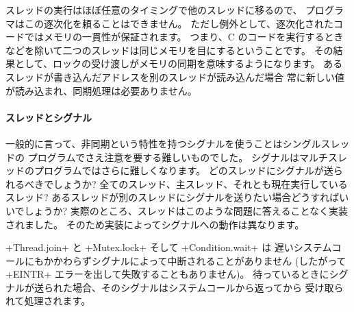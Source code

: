 スレッドの実行はほぼ任意のタイミングで他のスレッドに移るので、
プログラマはこの逐次化を頼ることはできません。
ただし例外として、逐次化されたコードではメモリの一貫性が保証されます。
つまり、C のコードを実行するときなどを除いて二つのスレッドは同じメモリを目にするということです。
その結果として、ロックの受け渡しがメモリの同期を意味するようになります。
あるスレッドが書き込んだアドレスを別のスレッドが読み込んだ場合
常に新しい値が読み込まれ、同期処理は必要ありません。

\paragraph {スレッドとシグナル}

一般的に言って、非同期という特性を持つシグナルを使うことはシングルスレッドの
プログラムでさえ注意を要する難しいものでした。
シグナルはマルチスレッドのプログラムではさらに難しくなります。
どのスレッドにシグナルが送られるべきでしょうか?
全てのスレッド、主スレッド、それとも現在実行しているスレッド?
あるスレッドが別のスレッドにシグナルを送りたい場合どうすればいいでしょうか?
実際のところ、スレッドはこのような問題に答えることなく実装されました。
そのため実装によってシグナルへの動作は異なります。

\ml+Thread.join+ と \ml+Mutex.lock+ そして \ml+Condition.wait+ は
遅いシステムコールにもかかわらずシグナルによって中断されることがありません
(したがって \ml+EINTR+ エラーを出して失敗することもありません)。
待っているときにシグナルが送られた場合、そのシグナルはシステムコールから返ってから
受け取られて処理されます。


